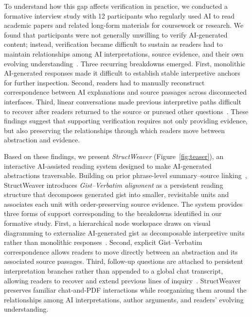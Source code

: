 \documentclass[manuscript,review,anonymous]{acmart}
\begin{document}
To understand how this gap affects verification in practice, we conducted a formative interview study with 12 participants who regularly used AI to read academic papers and related long-form materials for coursework or research. We found that participants were not generally unwilling to verify AI-generated content; instead, verification became difficult to sustain as readers had to maintain relationships among AI interpretations, source evidence, and their own evolving understanding~\cite{verification_burden_slr_iui,supporting_or_hindering_chi26}. Three recurring breakdowns emerged. First, monolithic AI-generated responses made it difficult to establish stable interpretive anchors for further inspection. Second, readers had to manually reconstruct correspondence between AI explanations and source passages across disconnected interfaces. Third, linear conversations made previous interpretive paths difficult to recover after readers returned to the source or pursued other questions~\cite{ai_chains,threddy}. These findings suggest that supporting verification requires not only providing evidence, but also preserving the relationships through which readers move between abstraction and evidence.

Based on these findings, we present \textit{StructWeaver} (Figure~\ref{fig:teaser}), an interactive AI-assisted reading system designed to make AI-generated abstractions traversable. Building on prior phrase-level summary--source linking~\cite{kambhamettu2024traceabletextdeepeningreading}, StructWeaver introduces \textit{Gist--Verbatim alignment} as a persistent reading structure that decomposes generated gist into smaller, revisitable units and associates each unit with order-preserving source evidence. The system provides three forms of support corresponding to the breakdowns identified in our formative study. First, a hierarchical node workspace draws on visual diagramming to externalize AI-generated gist as decomposable interpretive units rather than monolithic responses~\cite{graphologue,sensecape}. Second, explicit Gist--Verbatim correspondence allows readers to move directly between an abstraction and its associated source passages. Third, follow-up questions are attached to persistent interpretation branches rather than appended to a global chat transcript, allowing readers to recover and extend previous lines of inquiry~\cite{ai_chains,threddy}. StructWeaver preserves familiar chat-and-PDF interactions while reorganizing them around the relationships among AI interpretations, author arguments, and readers' evolving understanding.
\end{document}
